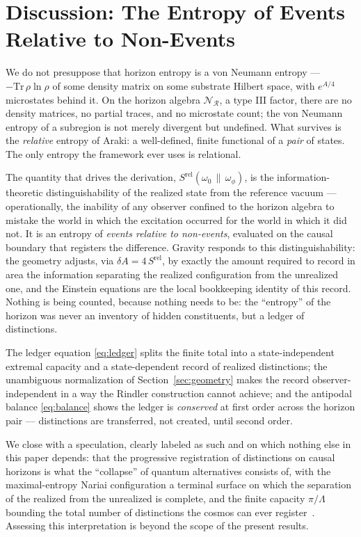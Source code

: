 \documentclass[11pt]{article}
\newcommand{\Srel}{S^{\mathrm{rel}}}
\newcommand{\Nariai}{Nariai}
\begin{document}
\section{Discussion: The Entropy of Events Relative to Non-Events}
\label{sec:discussion}

We do not presuppose that horizon entropy is a von Neumann entropy --- $-\mathrm{Tr}\,\rho\ln\rho$ of some density matrix on some substrate Hilbert space, with $e^{A/4}$ microstates behind it. On the horizon algebra $\mathscr{N}_{\mathcal{R}}$, a type III factor, there are no density matrices, no partial traces, and no microstate count; the von Neumann entropy of a subregion is not merely divergent but undefined. What survives is the \emph{relative} entropy of Araki: a well-defined, finite functional of a \emph{pair} of states. The only entropy the framework ever uses is relational.

The quantity that drives the derivation, $\Srel(\omega_0\,\|\,\omega_\phi)$, is the information-theoretic distinguishability of the realized state from the reference vacuum --- operationally, the inability of any observer confined to the horizon algebra to mistake the world in which the excitation occurred for the world in which it did not. It is an entropy of \emph{events relative to non-events}, evaluated on the causal boundary that registers the difference. Gravity responds to this distinguishability: the geometry adjusts, via $\delta A = 4\,\Srel$, by exactly the amount required to record in area the information separating the realized configuration from the unrealized one, and the Einstein equations are the local bookkeeping identity of this record. Nothing is being counted, because nothing needs to be: the ``entropy'' of the horizon was never an inventory of hidden constituents, but a ledger of distinctions.

The ledger equation \eqref{eq:ledger} splits the finite total into a state-independent extremal capacity and a state-dependent record of realized distinctions; the unambiguous normalization of Section~\ref{sec:geometry} makes the record observer-independent in a way the Rindler construction cannot achieve; and the antipodal balance \eqref{eq:balance} shows the ledger is \emph{conserved} at first order across the horizon pair --- distinctions are transferred, not created, until second order.

We close with a speculation, clearly labeled as such and on which nothing else in this paper depends: that the progressive registration of distinctions on causal horizons is what the ``collapse'' of quantum alternatives consists of, with the maximal-entropy \Nariai{} configuration a terminal surface on which the separation of the realized from the unrealized is complete, and the finite capacity $\pi/\Lambda$ bounding the total number of distinctions the cosmos can ever register~\cite{Hartshorn2025}. Assessing this interpretation is beyond the scope of the present results.
\end{document}
